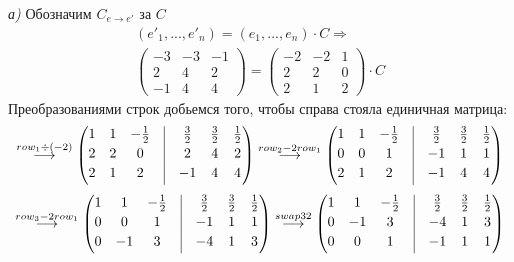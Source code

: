 \documentclass[a4paper,11pt]{article}
\begin{document}
\textsl{а)} 
Обозначим $  C_{e \rightarrow e'} $ за $ C $
\begin{gather*}
	(e'_1,..., e'_n) = (e_1, ..., e_n) \cdot C \Rightarrow \\
	\begin{pmatrix}
	-3 & -3 & -1 \\
	2 & 4 & 2 \\
	-1 & 4 & 4 
	\end{pmatrix}
	=
	\begin{pmatrix}
	-2 & -2 & 1 \\
	2 & 2 & 0 \\
	2 & 1 & 2 
	\end{pmatrix}
	\cdot C
\end{gather*}
Преобразованиями строк добьемся того, чтобы справа стояла единичная матрица:
\begin{gather*}
\stackrel{ row_{1} \div (-2) }{\longrightarrow}
\begin{pmatrix}
1 & 1 & -\frac{1}{2} & \vrule & \frac{3}{2} & \frac{3}{2} & \frac{1}{2} \\[2pt]
2 & 2 & 0 & \vrule & 2 & 4 & 2 \\[2pt]
2 & 1 & 2 & \vrule & -1 & 4 & 4 \\[2pt]
\end{pmatrix}
\stackrel{ row_{2} - 2row_{1} }{\longrightarrow}
\begin{pmatrix}
1 & 1 & -\frac{1}{2} & \vrule & \frac{3}{2} & \frac{3}{2} & \frac{1}{2} \\[2pt]
0 & 0 & 1 & \vrule & -1 & 1 & 1 \\[2pt]
2 & 1 & 2 & \vrule & -1 & 4 & 4 \\[2pt]
\end{pmatrix}
\\[3pt]
\stackrel{ row_{3} - 2row_{1} }{\longrightarrow}
\begin{pmatrix}
1 & 1 & -\frac{1}{2} & \vrule & \frac{3}{2} & \frac{3}{2} & \frac{1}{2} \\[2pt]
0 & 0 & 1 & \vrule & -1 & 1 & 1 \\[2pt]
0 & -1 & 3 & \vrule & -4 & 1 & 3 \\[2pt]
\end{pmatrix}
\stackrel{ swap 3 2 }{\longrightarrow}
\begin{pmatrix}
1 & 1 & -\frac{1}{2} & \vrule & \frac{3}{2} & \frac{3}{2} & \frac{1}{2} \\[2pt]
0 & -1 & 3 & \vrule & -4 & 1 & 3 \\[2pt]
0 & 0 & 1 & \vrule & -1 & 1 & 1 \\[2pt]

\end{pmatrix}
\end{gather*}
\end{document}
